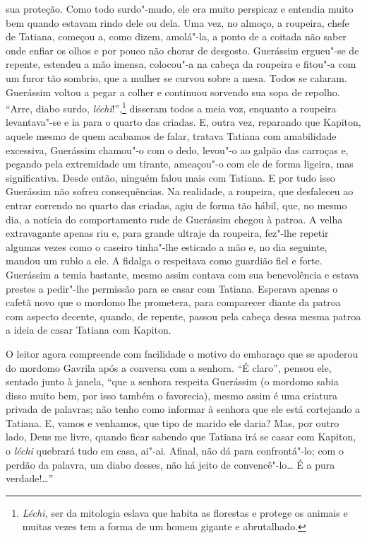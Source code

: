 sua proteção. Como todo surdo"-mudo, ele era muito perspicaz e entendia
muito bem quando estavam rindo dele ou dela. Uma vez, no almoço, a
roupeira, chefe de Tatiana, começou a, como dizem, amolá"-la, a ponto de
a coitada não saber onde enfiar os olhos e por pouco não chorar de
desgosto. Guerássim ergueu"-se de repente, estendeu a mão imensa,
colocou"-a na cabeça da roupeira e fitou"-a com um furor tão sombrio, que
a mulher se curvou sobre a mesa. Todos se calaram. Guerássim voltou a
pegar a colher e continuou sorvendo sua sopa de repolho. ``Arre, diabo
surdo, \emph{léchi}!'',\footnote{\emph{Léchi,} ser da mitologia eslava
  que habita as florestas e protege os animais e muitas vezes tem a
  forma de um homem gigante e abrutalhado.} disseram todos a meia voz,
enquanto a roupeira levantava"-se e ia para o quarto das criadas. E,
outra vez, reparando que Kapiton, aquele mesmo de quem acabamos de
falar, tratava Tatiana com amabilidade excessiva, Guerássim chamou"-o com
o dedo, levou"-o ao galpão das carroças e, pegando pela extremidade um
tirante, ameaçou"-o com ele de forma ligeira, mas significativa. Desde
então, ninguém falou mais com Tatiana. E por tudo isso Guerássim não
sofreu consequências. Na realidade, a roupeira, que desfaleceu ao entrar
correndo no quarto das criadas, agiu de forma tão hábil, que, no mesmo
dia, a notícia do comportamento rude de Guerássim chegou à patroa. A
velha extravagante apenas riu e, para grande ultraje da roupeira,
fez"-lhe repetir algumas vezes como o caseiro tinha"-lhe esticado a mão e, no dia seguinte, mandou um rublo a ele. A fidalga o respeitava
como guardião fiel e forte. Guerássim a temia bastante, mesmo assim
contava com sua benevolência e estava prestes a pedir"-lhe permissão para
se casar com Tatiana. Esperava apenas o cafetã novo que o mordomo lhe
prometera, para comparecer diante da patroa com aspecto decente, quando,
de repente, passou pela cabeça dessa mesma patroa a ideia de casar
Tatiana com Kapiton.

O leitor agora compreende com facilidade o motivo do embaraço que se
apoderou do mordomo Gavrila após a conversa com a senhora. ``É claro'',
pensou ele, sentado junto à janela, ``que a senhora respeita Guerássim
(o mordomo sabia disso muito bem, por isso também o favorecia), mesmo
assim é uma criatura privada de palavras; não tenho como informar à
senhora que ele está cortejando a Tatiana. E, vamos e venhamos, que tipo
de marido ele daria? Mas, por outro lado, Deus me livre, quando ficar
sabendo que Tatiana irá se casar com Kapiton, o \emph{léchi} quebrará
tudo em casa, ai"-ai. Afinal, não dá para confrontá"-lo; com o perdão da
palavra, um diabo desses, não há jeito de convencê"-lo\ldots{} É a pura
verdade!\ldots{}''

